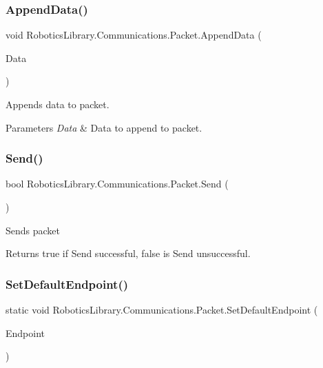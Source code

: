\subsubsection{\texorpdfstring{Append\+Data()}{AppendData()}}
{\footnotesize\ttfamily void Robotics\+Library.\+Communications.\+Packet.\+Append\+Data (\begin{DoxyParamCaption}\item[{byte \mbox{[}$\,$\mbox{]}}]{Data }\end{DoxyParamCaption})}



Appends data to packet. 


\begin{DoxyParams}{Parameters}
{\em Data} & Data to append to packet.\\
\hline
\end{DoxyParams}
\mbox{\label{class_robotics_library_1_1_communications_1_1_packet_aea2ef8cc2357083a18bf3c1da0b0bdec}} 
\subsubsection{\texorpdfstring{Send()}{Send()}}
{\footnotesize\ttfamily bool Robotics\+Library.\+Communications.\+Packet.\+Send (\begin{DoxyParamCaption}{ }\end{DoxyParamCaption})}



Sends packet 

\begin{DoxyReturn}{Returns}
true if Send successful, false is Send unsuccessful. 
\end{DoxyReturn}
\mbox{\label{class_robotics_library_1_1_communications_1_1_packet_a95a0bb161aa290379b3d016b02707e93}} 
\subsubsection{\texorpdfstring{Set\+Default\+Endpoint()}{SetDefaultEndpoint()}}
{\footnotesize\ttfamily static void Robotics\+Library.\+Communications.\+Packet.\+Set\+Default\+Endpoint (\begin{DoxyParamCaption}\item[{I\+P\+End\+Point}]{Endpoint }\end{DoxyParamCaption})\hspace{0.3cm}{\ttfamily [static]}}



